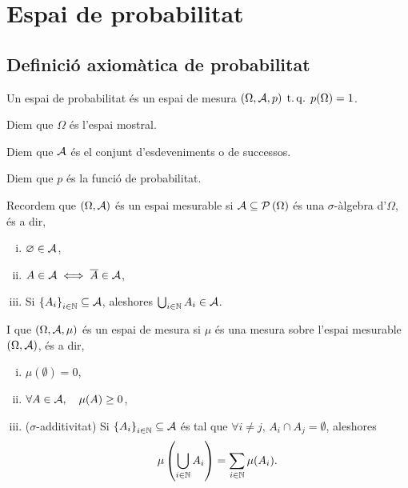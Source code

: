 \chapter{Espai de probabilitat}

\section{Definició axiomàtica de probabilitat}

\begin{defi}
    Un espai de probabilitat és un espai de mesura $(\Omega,\mathcal{A}, p) \operatorname{\;t.q.\;} p(\Omega)=1$.
\end{defi}

\begin{defi}
    Diem que $\Omega$ és l'espai mostral.
\end{defi}

\begin{defi}
    Diem que $\mathcal{A}$ és el conjunt d'esdeveniments o de successos.
\end{defi}

\begin{defi}
    Diem que $p$ és la funció de probabilitat.
\end{defi}

\begin{obs}
    Recordem que $\left(\Omega,\mathcal{A}\right)$ és un espai mesurable si $\mathcal{A}\subseteq \mathcal{P}\left(\Omega\right)$ és una $\sigma$-àlgebra d'$\Omega$, és a dir,
    \begin{enumerate}[i)]
        \item $\varnothing \in \mathcal{A}$,
        \item $A \in \mathcal{A} \iff \overline{A} \in \mathcal{A}$,
        \item Si $\left\{ A_i\right\} _{i\in\mathbb{N}}\subseteq \mathcal{A}$, aleshores $\bigcup_{i\in\mathbb{N}}{A_i} \in \mathcal{A}$.
    \end{enumerate}
    I que $\left(\Omega,\mathcal{A},\mu\right)$ és un espai de mesura si $\mu$ és una mesura sobre l'espai mesurable $\left(\Omega,\mathcal{A}\right)$, és a dir,
    \begin{enumerate}[i)]
        \item $\mu(\emptyset) = 0$,
        \item $\forall A \in \mathcal{A},\quad \mu(A) \ge0$,
        \item ($\sigma$-additivitat) Si $\left\{ A_i\right\}_{i\in\mathbb{N}}\subseteq\mathcal{A}$ és tal que $\forall i \neq j, \, A_i \cap A_j = \emptyset$,
        aleshores 
        \[
            \mu\left(\bigcup_{i\in\mathbb{N}}{A_i}\right) = \sum_{i\in\mathbb{N}}{\mu(A_i)}.
        \]
    \end{enumerate}
\end{obs}

